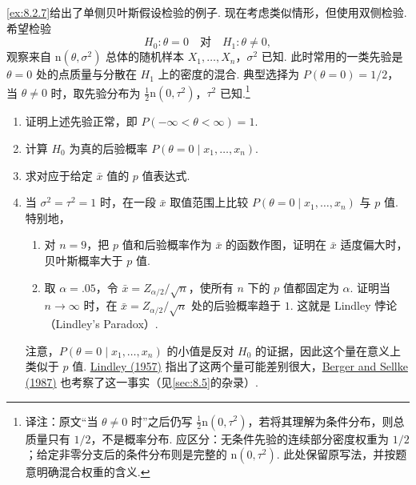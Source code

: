 \begin{exercise}\label{exercise:8.53}
\autoref{ex:8.2.7}给出了单侧贝叶斯假设检验的例子. 现在考虑类似情形，但使用双侧检验. 希望检验
$$H_0:\theta=0\quad\text{对}\quad H_1:\theta\ne0,$$
观察来自 $\mathrm n(\theta,\sigma^2)$ 总体的随机样本 $X_1,\ldots,X_n$，$\sigma^2$ 已知. 此时常用的一类先验是 $\theta=0$ 处的点质量与分散在 $H_1$ 上的密度的混合. 典型选择为 $P(\theta=0)=1/2$，当 $\theta\ne0$ 时，取先验分布为 $\frac12\mathrm n(0,\tau^2)$，$\tau^2$ 已知.\footnote{译注：原文“当 $\theta\ne0$ 时”之后仍写 $\tfrac12\mathrm n(0,\tau^2)$，若将其理解为条件分布，则总质量只有 $1/2$，不是概率分布. 应区分：无条件先验的连续部分密度权重为 $1/2$；给定非零分支后的条件分布则是完整的 $\mathrm n(0,\tau^2)$. 此处保留原写法，并按题意明确混合权重的含义.}
\begin{enumerate}
\item 证明上述先验正常，即 $P(-\infty<\theta<\infty)=1$.
\item 计算 $H_0$ 为真的后验概率 $P(\theta=0\mid x_1,\ldots,x_n)$.
\item 求对应于给定 $\bar x$ 值的 $p$ 值表达式.
\item 当 $\sigma^2=\tau^2=1$ 时，在一段 $\bar x$ 取值范围上比较 $P(\theta=0\mid x_1,\ldots,x_n)$ 与 $p$ 值. 特别地，
\begin{enumerate}[label=\roman*.]
\item 对 $n=9$，把 $p$ 值和后验概率作为 $\bar x$ 的函数作图，证明在 $\bar x$ 适度偏大时，贝叶斯概率大于 $p$ 值.
\item 取 $\alpha=.05$，令 $\bar x=Z_{\alpha/2}/\sqrt n$，使所有 $n$ 下的 $p$ 值都固定为 $\alpha$. 证明当 $n\to\infty$ 时，在 $\bar x=Z_{\alpha/2}/\sqrt n$ 处的后验概率趋于 $1$. 这就是 Lindley 悖论（Lindley's Paradox\mbox{）.}
\end{enumerate}
注意，$P(\theta=0\mid x_1,\ldots,x_n)$ 的小值是反对 $H_0$ 的证据，因此这个量在意义上类似于 $p$ 值. \hyperref[bib:source204]{Lindley (1957)} 指出了这两个量可能差别很大，\hyperref[bib:source21]{Berger and Sellke (1987)} 也考察了这一事实（见\autoref{sec:8.5}的杂录\mbox{）.}
\end{enumerate}
\end{exercise}

